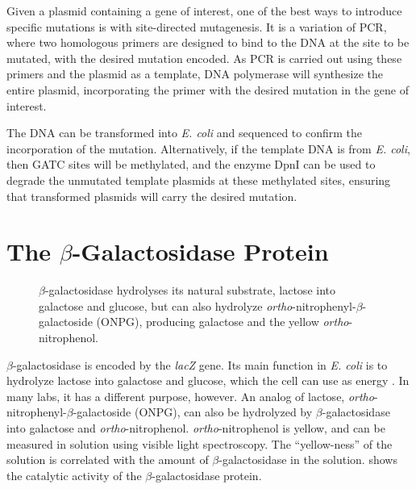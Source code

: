 Given a plasmid containing a gene of interest, one of the best ways to introduce specific mutations is with site-directed mutagenesis. It is a variation of PCR, where two homologous primers are designed to bind to the DNA at the site to be mutated, with the desired mutation encoded. As PCR is carried out using these primers and the plasmid as a template, DNA polymerase will synthesize the entire plasmid, incorporating the primer with the desired mutation in the gene of interest.

The DNA can be transformed into \textit{E. coli} and sequenced to confirm the incorporation of the mutation. Alternatively, if the template DNA is from \textit{E. coli}, then GATC sites will be methylated, and the enzyme DpnI can be used to degrade the unmutated template plasmids at these methylated sites, ensuring that transformed plasmids will carry the desired mutation.

\section{The \(\beta\)-Galactosidase Protein}

\begin{figure}[h!]
\centering

\caption[\(\beta\)-Galactosidase Function]{\(\beta\)-galactosidase hydrolyses its natural substrate, lactose into galactose and glucose, but can also hydrolyze \textit{ortho}-nitrophenyl-\(\beta\)-galactoside (ONPG), producing galactose and the yellow \textit{ortho}-nitrophenol.}
\label{fig:betagal}
\end{figure}


\(\beta\)-galactosidase is encoded by the \textit{lacZ} gene. Its main function in \textit{E. coli} is to hydrolyze lactose into galactose and glucose, which the cell can use as energy \parencite{juersLacZVgalactosidaseStructure2012}. In many labs, it has a different purpose, however. An analog of lactose, \textit{ortho}-nitrophenyl-\(\beta\)-galactoside (ONPG), can also be hydrolyzed by \(\beta\)-galactosidase into galactose and \textit{ortho}-nitrophenol. \textit{ortho}-nitrophenol is yellow, and can be measured in solution using visible light spectroscopy. The ``yellow-ness'' of the solution is correlated with the amount of \(\beta\)-galactosidase in the solution.  shows the catalytic activity of the \(\beta\)-galactosidase protein.

